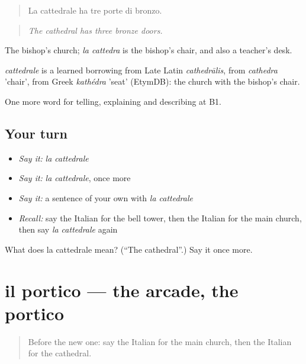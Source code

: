 \begin{quote}
La cattedrale ha tre porte di bronzo.
\end{quote}

\begin{quote}
\emph{The cathedral has three bronze doors.}
\end{quote}

The bishop's church; \emph{la cattedra} is the bishop's chair, and also a teacher's desk.

\begin{cousinweb}
\emph{cattedrale} is a learned borrowing from Late Latin \emph{cathedrālis}, from \emph{cathedra} 'chair', from Greek \emph{kathédra} 'seat' (EtymDB): the church with the bishop's chair.
\end{cousinweb}

\begin{grammarlens}[title={What you've built}]
One more word for telling, explaining and describing at B1.
\end{grammarlens}

\subsection*{Your turn}
\begin{itemize}
\raggedright
  \item \emph{Say it:} \emph{la cattedrale}
  \item \emph{Say it:} \emph{la cattedrale}, once more
  \item \emph{Say it:} a sentence of your own with \emph{la cattedrale}
  \item \emph{Recall:} say the Italian for the bell tower, then the Italian for the main church, then say \emph{la cattedrale} again
\end{itemize}

\begin{tcolorbox}[breakable,colback=teal!4,colframe=teal!35!black,title={Before you move on}]
What does la cattedrale mean? (\textquotedblleft{}The cathedral\textquotedblright{}.) Say it once more.
\end{tcolorbox}
\section[il portico]{il portico — the arcade, the portico}

\label{lesson:IT-C445-portico}



\begin{quote}
Before the new one: say the Italian for the main church, then the Italian for the cathedral.
\end{quote}

